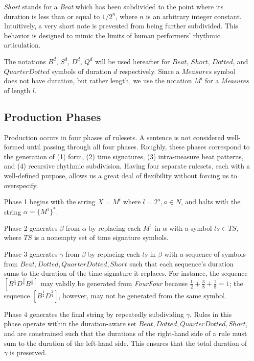 \documentclass{article}
\begin{document}
\emph{Short} stands for a \emph{Beat} which has been subdivided to the point where its duration is less than or equal to $1/2^n$, where $n$ is an arbitrary integer constant. Intuitively, a very short note is prevented from being further subdivided. This behavior is designed to mimic the limits of human performers’ rhythmic articulation.

The notations $B^d$, $S^d$, $D^d$, $Q^d$ will be used hereafter for $Beat$, $Short$, $Dotted$, and $QuarterDotted$ symbols of duration $d$ respectively. Since a $Measures$ symbol does not have duration, but rather length, we use the notation $M^l$ for a \emph{Measures} of length $l$.

\subsection{Production Phases}


Production occurs in four phases of rulesets. A sentence is not considered well-formed until passing through all four phases. Roughly, these phases correspond to the generation of (1) form, (2) time signatures, (3) intra-measure beat patterns, and (4) recursive rhythmic subdivision. Having four separate rulesets, each with a well-defined purpose, allows us a great deal of flexibility without forcing us to overspecify. 

Phase 1 begins with the string $X = M^l$ where $l=2^a, a \in N$, and halts with the string $\alpha = \{ M^1 \}^*$.

Phase 2 generates $\beta$ from $\alpha$ by replacing each $M^1$ in $\alpha$ with a symbol $ts \in TS$, where $TS$ is a nonempty set of time signature symbols.

Phase 3 generates $\gamma$ from $\beta$ by replacing each $ts$ in $\beta$ with a sequence of symbols from ${Beat, Dotted, QuarterDotted, Short}$ such that each sequence's duration sums to the duration of the time signature it replaces. For instance, the sequence $[B^\frac{1}{2} D^\frac{3}{8} B^\frac{1}{8}]$ may validly be generated from \emph{FourFour} because $\frac{1}{2} + \frac{3}{8} + \frac{1}{8} = 1$; the sequence $[B^\frac{1}{2} D^\frac{3}{4}]$, however, may not be generated from the same symbol.

Phase 4 generates the final string by repeatedly subdividing $\gamma$. Rules in this phase operate within the duration-aware set ${Beat, Dotted, QuarterDotted, Short}$, and are constrained such that the durations of the right-hand side of a rule must sum to the duration of the left-hand side. This ensures that the total duration of $\gamma$ is preserved.
\end{document}

